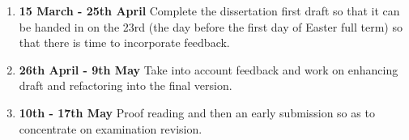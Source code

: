 \documentclass[12pt,a4paper,twoside]{article}
\begin{document}
\begin{enumerate}
\item \textbf{15 March - 25th April}
Complete the dissertation first draft so that it can be handed in on the 23rd (the day before the first day of Easter full term) so that there is time to incorporate feedback.

\item \textbf{26th April - 9th May}
Take into account feedback and work on enhancing draft and refactoring into the final version.

\item \textbf{10th - 17th May}
Proof reading and then an early submission so as to concentrate on examination revision.

\end{enumerate}


 
\end{document}
